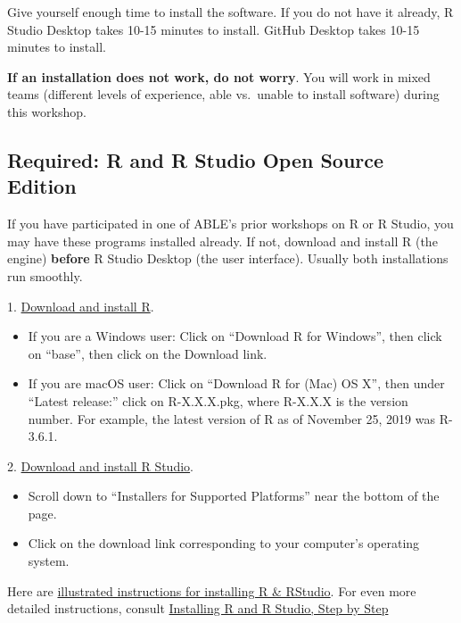 \documentclass[
]{article}
\providecommand{\tightlist}{%
  \setlength{\itemsep}{0pt}\setlength{\parskip}{0pt}}
\begin{document}
Give yourself enough time to install the software. If you do not have it
already, R Studio Desktop takes 10-15 minutes to install. GitHub Desktop
takes 10-15 minutes to install.

\textbf{If an installation does not work, do not worry}. You will work
in mixed teams (different levels of experience, able vs.~unable to
install software) during this workshop.

\hypertarget{required-r-and-r-studio-open-source-edition}{%
\subsection{Required: R and R Studio Open Source
Edition}\label{required-r-and-r-studio-open-source-edition}}

If you have participated in one of ABLE's prior workshops on R or R
Studio, you may have these programs installed already. If not, download
and install R (the engine) \textbf{before} R Studio Desktop (the user
interface). Usually both installations run smoothly.

1. \href{https://cloud.r-project.org/}{Download and install R}.

\begin{itemize}
\tightlist
\item
  If you are a Windows user: Click on ``Download R for Windows'', then
  click on ``base'', then click on the Download link.
\item
  If you are macOS user: Click on ``Download R for (Mac) OS X'', then
  under ``Latest release:'' click on R-X.X.X.pkg, where R-X.X.X is the
  version number. For example, the latest version of R as of November
  25, 2019 was R-3.6.1.
\end{itemize}

2. \href{https://www.rstudio.com/products/rstudio/download/}{Download
and install R Studio}.

\begin{itemize}
\tightlist
\item
  Scroll down to ``Installers for Supported Platforms'' near the bottom
  of the page.
\item
  Click on the download link corresponding to your computer's operating
  system.
\end{itemize}

Here are
\href{https://www.r-bloggers.com/2022/01/how-to-install-and-update-r-and-rstudio/}{illustrated
instructions for installing R \& RStudio}. For even more detailed
instructions, consult
\href{https://moderndive.netlify.app/1-getting-started.html}{Installing
R and R Studio, Step by Step}
\end{document}
